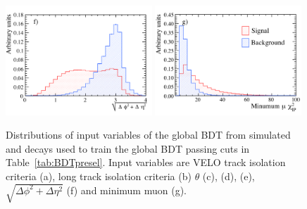 \begin{figure}[tbp]
 \includegraphics[width=0.49\textwidth]{./Figs/Selection/srqt_Mar.pdf}
 \includegraphics[width=0.49\textwidth]{./Figs/Selection/Min_IP_Mar.pdf}

    \caption{Distributions of input variables of the global BDT from simulated \bsmumu and \bbbarmumux decays used to train the global BDT passing cuts in Table~\ref{tab:BDTpresel}. Input variables are VELO track isolation criteria (a), long track isolation criteria (b) $\theta$ (c), \bs \chiIP (d), \bs \chivtx (e), $\sqrt{\Delta \phi^{2} + \Delta \eta^{2}}$ (f) and minimum muon \chiIP (g).}
    \label{fig:BDTvars}
\end{figure}






